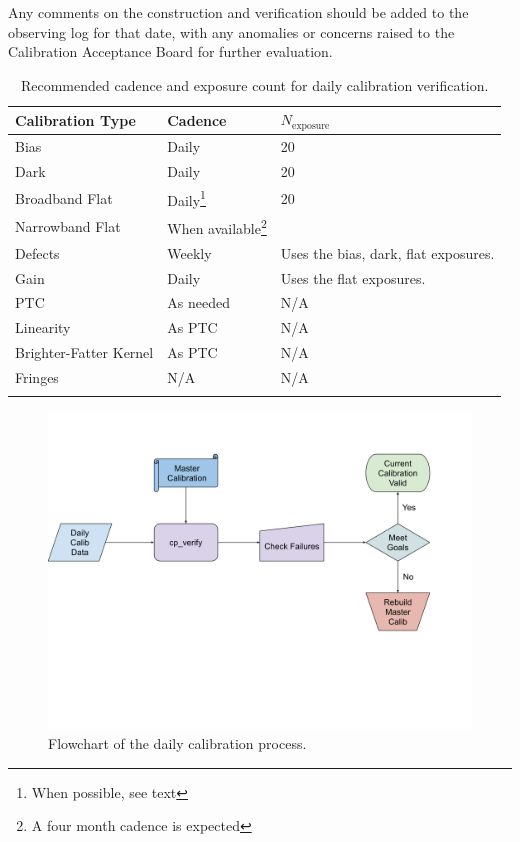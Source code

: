 \documentclass[DM,authoryear,toc]{lsstdoc}
\begin{document}
Any comments on the construction and verification should be added to the observing log for that date, with any anomalies or concerns raised to the Calibration Acceptance Board for further evaluation.

\begin{longtable}{l l l}
  Calibration Type & Cadence & $N_{\textrm{exposure}}$ \\
  \hline
  \endhead
  Bias       & Daily  & 20 \\
  Dark       & Daily  & 20 \\
  Broadband Flat       & Daily\footnote{When possible, see text} & 20 \\
  Narrowband Flat & When available\footnote{A four month cadence is expected} & \\
  Defects    & Weekly & Uses the bias, dark, flat exposures. \\
  Gain       & Daily  & Uses the flat exposures. \\
  PTC        & As needed & N/A \\
  Linearity  & As PTC    & N/A \\
  Brighter-Fatter Kernel & As PTC & N/A \\
  Fringes    & N/A  & N/A \\
  \hline
  \caption{Recommended cadence and exposure count for daily calibration verification.}
  \label{tab:cadence}
\end{longtable}

\begin{figure}
  \includegraphics[width=\linewidth]{figures/daily_processing.png}
  \caption{Flowchart of the daily calibration process.}
  \label{fig:daily}
\end{figure}
\end{document}
